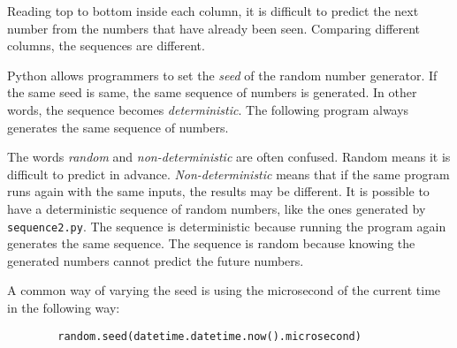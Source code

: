 Reading top to bottom inside each column, it is difficult to predict
the next number from the numbers that have already been seen.
Comparing different columns, the sequences are different.

Python allows programmers to set  the {\it seed} of the random number generator.
If the same seed is same, the same sequence of numbers is generated.
In other words, the sequence becomes {\it deterministic}.  The following program
always generates the same sequence of numbers.


\resetlinenumber[1]
\linenumbers
\begin{tt}
  
\end{tt}
\nolinenumbers


The words {\it random} and {\it non-deterministic} are often confused.
Random means it is difficult to predict in advance.  {\it
  Non-deterministic} means that if the same program runs again with
the same inputs, the results may be different.  It is possible to have
a deterministic sequence of random numbers, like the ones generated by
{\tt sequence2.py}.  The sequence is deterministic because running the
program again generates the same sequence. The sequence is random
because knowing the generated numbers cannot predict the future
numbers.



A common way of varying the seed is using the microsecond of the
current time in the following way:

\begin{verbatim}
        random.seed(datetime.datetime.now().microsecond)
\end{verbatim}


